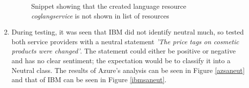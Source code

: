\begin{enumerate}
\begin {figure}[h!h]
            \caption{Snippet showing that the created language resource \textit{coglangservice} is not shown in list of resources}
            \label{textclass1}
        \end {figure}
    \newpage
    \item \label{item:neutral} During testing, it was seen that IBM did not identify neutral much, so tested both service providers with a neutral statement \textit{'The price tags on cosmetic products were changed'}. The statement could either be positive or negative and has no clear sentiment; the expectation would be to classify it into a Neutral class. The results of Azure's analysis can be seen in Figure \ref{azsaneut} and that of IBM can be seen in Figure \ref{ibmsaneut}.
        \begin {figure}[h!h]
            \centering

\end{figure}
\end{enumerate}
